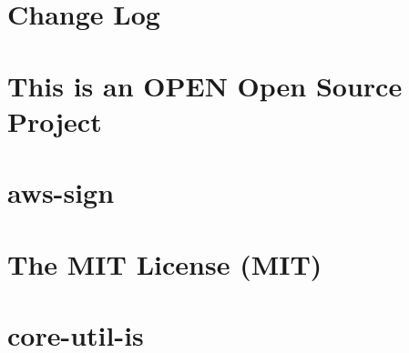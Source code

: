 \documentclass[twoside]{book}
\newcommand{\+}{\discretionary{\mbox{\scriptsize$\hookleftarrow$}}{}{}}
\begin{document}
\chapter{Change Log}
\label{md__c_1__users_martin__documents__git_hub_visual_studio__bachelor__wis_r__wis_r_node_modules_gru1b5b2d82de47246717b9ca97e1ca4d49}
\hypertarget{md__c_1__users_martin__documents__git_hub_visual_studio__bachelor__wis_r__wis_r_node_modules_gru1b5b2d82de47246717b9ca97e1ca4d49}{}

\chapter{This is an O\+P\+E\+N Open Source Project}
\label{md__c_1__users_martin__documents__git_hub_visual_studio__bachelor__wis_r__wis_r_node_modules_grua5259f74de6f50747965863bb3f7e718}
\hypertarget{md__c_1__users_martin__documents__git_hub_visual_studio__bachelor__wis_r__wis_r_node_modules_grua5259f74de6f50747965863bb3f7e718}{}

\chapter{aws-\/sign}
\label{md__c_1__users_martin__documents__git_hub_visual_studio__bachelor__wis_r__wis_r_node_modules_gru3af0d708955e056ca8158963231538e4}
\hypertarget{md__c_1__users_martin__documents__git_hub_visual_studio__bachelor__wis_r__wis_r_node_modules_gru3af0d708955e056ca8158963231538e4}{}

\chapter{The M\+I\+T License (M\+I\+T)}
\label{md__c_1__users_martin__documents__git_hub_visual_studio__bachelor__wis_r__wis_r_node_modules_gru4fc18eabc789cc6865fd2e11ea98f957}
\hypertarget{md__c_1__users_martin__documents__git_hub_visual_studio__bachelor__wis_r__wis_r_node_modules_gru4fc18eabc789cc6865fd2e11ea98f957}{}

\chapter{core-\/util-\/is}
\label{md__c_1__users_martin__documents__git_hub_visual_studio__bachelor__wis_r__wis_r_node_modules_gruea193ce54fe508a62f219b69da654ead}
\hypertarget{md__c_1__users_martin__documents__git_hub_visual_studio__bachelor__wis_r__wis_r_node_modules_gruea193ce54fe508a62f219b69da654ead}{}

\end{document}
